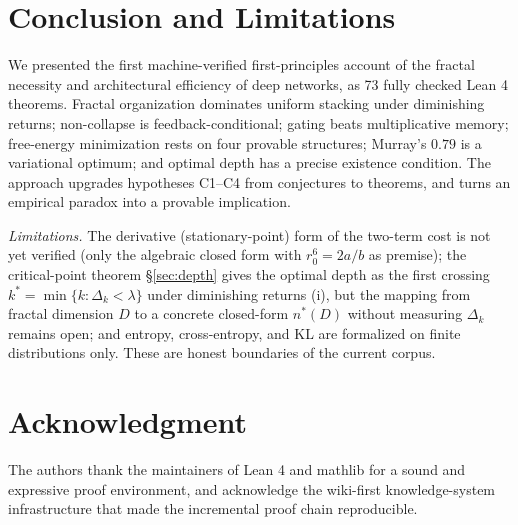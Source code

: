 \documentclass[conference]{IEEEtran}
\begin{document}
\section{Conclusion and Limitations}
\label{sec:conclusion}
We presented the first machine-verified first-principles account of the
fractal necessity and architectural efficiency of deep networks, as 73 fully
checked Lean 4 theorems. Fractal organization dominates uniform stacking under
diminishing returns; non-collapse is feedback-conditional; gating beats
multiplicative memory; free-energy minimization rests on four provable
structures; Murray's $0.79$ is a variational optimum; and optimal depth has a
precise existence condition. The approach upgrades hypotheses C1--C4 from
conjectures to theorems, and turns an empirical paradox into a provable
implication.

\emph{Limitations.} The derivative (stationary-point) form of the two-term
cost is not yet verified (only the algebraic closed form with $r_0^6=2a/b$ as
premise); the critical-point theorem
\S\ref{sec:depth} gives the optimal depth as the first crossing
$k^*=\min\{k:\Delta_k<\lambda\}$ under diminishing returns (i), but the mapping
from fractal dimension $D$ to a concrete closed-form $n^*(D)$ without measuring
$\Delta_k$ remains open; and entropy,
cross-entropy, and KL are formalized on finite distributions only. These are
honest boundaries of the current corpus.

\section*{Acknowledgment}
The authors thank the maintainers of Lean 4 and mathlib for a sound and
expressive proof environment, and acknowledge the wiki-first knowledge-system
infrastructure that made the incremental proof chain reproducible.
\end{document}
